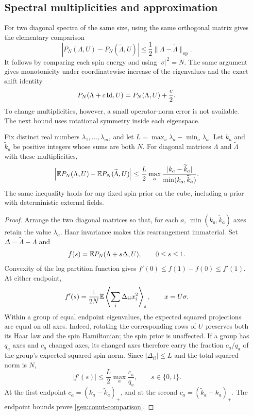 \subsection{Spectral multiplicities and approximation}

For two diagonal spectra of the same size, using the same orthogonal
matrix gives the elementary comparison
\begin{equation}\label{gen:operator-comparison}
 |P_N(\Lambda,U)-P_N(\widetilde\Lambda,U)|
 \le\frac12\|\Lambda-\widetilde\Lambda\|_{\mathrm{op}}.
\end{equation}
It follows by comparing each spin energy and using $|\sigma|^2=N$.
The same argument gives monotonicity under coordinatewise increase of
the eigenvalues and the exact shift identity
\begin{equation}\label{gen:scalar-shift}
 P_N(\Lambda+c\operatorname{Id},U)=P_N(\Lambda,U)+\frac c2.
\end{equation}
To change multiplicities, however, a small operator-norm error is not
available.  The next bound uses rotational symmetry inside each
eigenspace.

\begin{lemma}\label{gen:counts}
Fix distinct real numbers $\lambda_1,\ldots,\lambda_m$, and let
$L=\max_a\lambda_a-\min_a\lambda_a$.  Let $k_a$ and
$\widetilde k_a$ be positive integers whose sums are both $N$.
For diagonal matrices $\Lambda$ and $\widetilde\Lambda$ with these
multiplicities,
\begin{equation}\label{gen:count-comparison}
 \left|\mathbb E P_N(\Lambda,U)-\mathbb E P_N(\widetilde\Lambda,U)\right|
 \le\frac L2\max_a
 \frac{|k_a-\widetilde k_a|}{\min(k_a,\widetilde k_a)}.
\end{equation}
The same inequality holds for any fixed spin prior on the cube,
including a prior with deterministic external fields.
\end{lemma}

\begin{proof}
Arrange the two diagonal matrices so that, for each $a$,
$\min(k_a,\widetilde k_a)$ axes retain the value $\lambda_a$.
Haar invariance makes this rearrangement immaterial.  Set
$\Delta=\widetilde\Lambda-\Lambda$ and
\[
 f(s)=\mathbb E P_N(\Lambda+s\Delta,U),\qquad 0\le s\le1.
\]
Convexity of the log partition function gives
$f'(0)\le f(1)-f(0)\le f'(1)$.  At either endpoint,
\[
 f'(s)=\frac1{2N}\mathbb E\left\langle\sum_i\Delta_{ii}x_i^2
                  \right\rangle_s,
 \qquad x=U\sigma.
\]
Within a group of equal endpoint eigenvalues, the expected squared
projections are equal on all axes.  Indeed, rotating the corresponding
rows of $U$ preserves both its Haar law and the spin Hamiltonian; the
spin prior is unaffected.  If a group has $q_a$ axes and $c_a$ changed
axes, its changed axes therefore carry the fraction $c_a/q_a$ of the
group's expected squared spin norm.  Since $|\Delta_{ii}|\le L$ and
the total squared norm is $N$,
\[
 |f'(s)|\le\frac L2\max_a\frac{c_a}{q_a},
 \qquad s\in\{0,1\}.
\]
At the first endpoint $c_a=(k_a-\widetilde k_a)_+$, and at the second
$c_a=(\widetilde k_a-k_a)_+$.  The endpoint bounds prove
\eqref{gen:count-comparison}.
\end{proof}

